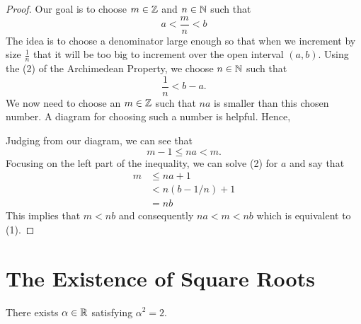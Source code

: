 \begin{proof}
    Our goal is to choose \( m \in \mathbb{Z} \) and \( n \in \mathbb{N} \) such that 
    \[  a < \frac{ m}{n} < b \tag{1}\]
    The idea is to choose a denominator large enough so that when we increment by size \( \frac{1}{n}\) that it will be too big to increment over the open interval \( (a,b)\). Using the (2) of the Archimedean Property, we choose \( n \in \mathbb{N} \) such that 
    \[ \frac{1}{n} < b - a \tag{2}.\]
    We now need to choose an \( m \in \mathbb{Z} \) such that \( na \) is smaller than this chosen number. A diagram for choosing such a number is helpful. Hence, 

    Judging from our diagram, we can see that 
    \[ m-1 \leq na < m.\]
    Focusing on the left part of the inequality, we can solve (2) for \( a \) and say that 
    \begin{align*}
        m &\leq na + 1  \\ 
            &< n(b - 1/n) + 1 \\ 
            &= nb
    \end{align*} 
    This implies that \( m < nb \) and consequently \( na < m < nb \) which is equivalent to (1). 
    
    
\end{proof}



\section{The Existence of Square Roots}
\begin{tcolorbox}
    \begin{thm}
        There exists \( \alpha \in \mathbb{R}  \) satisfying \( \alpha^2 = 2 \).
    \end{thm}
\end{tcolorbox}

